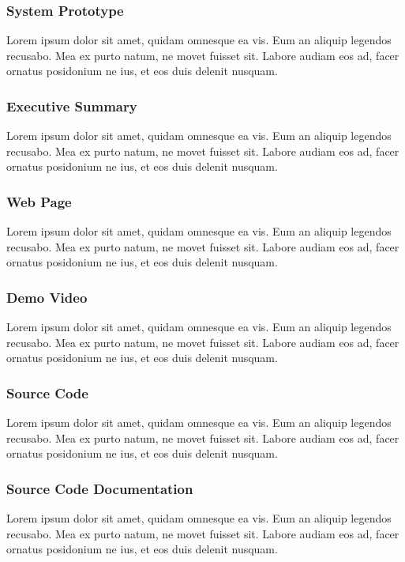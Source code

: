 \subsubsection{System Prototype}
Lorem ipsum dolor sit amet, quidam omnesque ea vis. Eum an aliquip legendos recusabo. Mea ex purto natum, ne movet fuisset sit. Labore audiam eos ad, facer ornatus posidonium ne ius, et eos duis delenit nusquam.

\subsubsection{Executive Summary}
Lorem ipsum dolor sit amet, quidam omnesque ea vis. Eum an aliquip legendos recusabo. Mea ex purto natum, ne movet fuisset sit. Labore audiam eos ad, facer ornatus posidonium ne ius, et eos duis delenit nusquam.

\subsubsection{Web Page}
Lorem ipsum dolor sit amet, quidam omnesque ea vis. Eum an aliquip legendos recusabo. Mea ex purto natum, ne movet fuisset sit. Labore audiam eos ad, facer ornatus posidonium ne ius, et eos duis delenit nusquam.

\subsubsection{Demo Video}
Lorem ipsum dolor sit amet, quidam omnesque ea vis. Eum an aliquip legendos recusabo. Mea ex purto natum, ne movet fuisset sit. Labore audiam eos ad, facer ornatus posidonium ne ius, et eos duis delenit nusquam.

\subsubsection{Source Code}
Lorem ipsum dolor sit amet, quidam omnesque ea vis. Eum an aliquip legendos recusabo. Mea ex purto natum, ne movet fuisset sit. Labore audiam eos ad, facer ornatus posidonium ne ius, et eos duis delenit nusquam.

\subsubsection{Source Code Documentation}
Lorem ipsum dolor sit amet, quidam omnesque ea vis. Eum an aliquip legendos recusabo. Mea ex purto natum, ne movet fuisset sit. Labore audiam eos ad, facer ornatus posidonium ne ius, et eos duis delenit nusquam.

